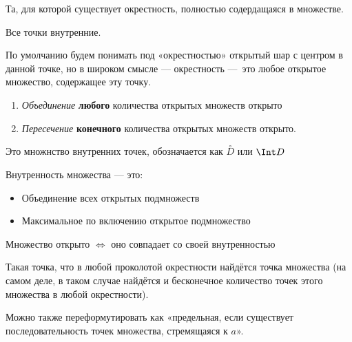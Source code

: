 \documentclass[12pt, a4paper]{article}
\begin{document}
  \begin{definition}
    Та, для которой существует окрестность, полностью содердащаяся в множестве.
  \end{definition}

  \begin{definition}
    Все точки внутренние.
  \end{definition}

  \begin{note}
    По умолчанию будем понимать под «окрестностью» открытый шар с центром в данной точке, 
    но в широком смысле — окрестность — это любое открытое множество, содержащее эту точку.
  \end{note}

  \begin{property}
    
    \begin{enumerate}
      \item \textit{Объединение} \textbf{любого} количества открытых множеств открыто
      \item \textit{Пересечение} \textbf{конечного} количества открытых множеств открыто.
    \end{enumerate}
  \end{property}


  \begin{definition}
    Это множнство внутренних точек, обозначается как $\overset{\circ}{D}$ или $\Int D$
  \end{definition}

  \begin{property}
    Внутренность множества — это:
    
    \begin{itemize}
      \item Объединение всех открытых подмножеств
      \item Максимальное по включению открытое подмножество
    \end{itemize}
  \end{property}

  \begin{note}
    Множество открыто $\Longleftrightarrow$ оно совпадает со своей внутренностью
  \end{note}


  \begin{definition}
    [Предельная точка = точка сгущения множества]
    Такая точка, что в любой проколотой окрестности найдётся точка множества 
    (на самом деле, в таком случае найдётся и бесконечное количество точек этого множества в любой окрестности).
  \end{definition}
  Можно также переформутировать как «предельная, если существует последовательность точек множества, стремящаяся к $a$».
\end{document}
